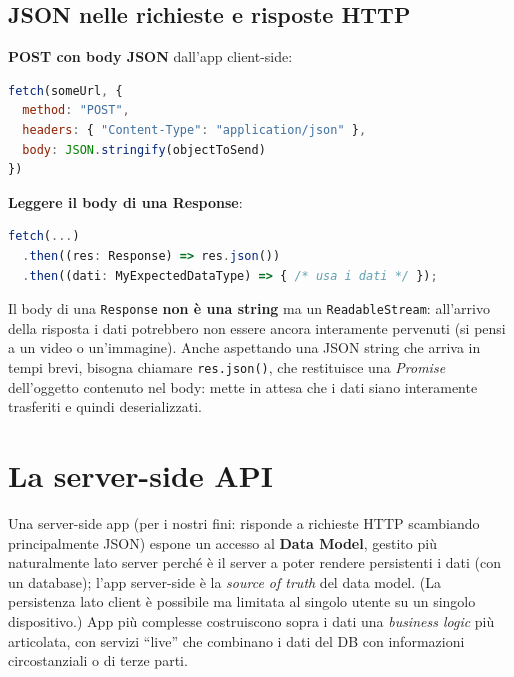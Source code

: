 \subsection{JSON nelle richieste e risposte HTTP}
\textbf{POST con body JSON} dall'app client-side:
\begin{lstlisting}[language=JavaScript]
fetch(someUrl, {
  method: "POST",
  headers: { "Content-Type": "application/json" },
  body: JSON.stringify(objectToSend)
})
\end{lstlisting}
\textbf{Leggere il body di una Response}:
\begin{lstlisting}[language=JavaScript]
fetch(...)
  .then((res: Response) => res.json())
  .then((dati: MyExpectedDataType) => { /* usa i dati */ });
\end{lstlisting}
\begin{attenzione}
Il body di una \texttt{Response} \textbf{non \`e una string} ma un
\texttt{ReadableStream}: all'arrivo della risposta i dati potrebbero non essere ancora
interamente pervenuti (si pensi a un video o un'immagine). Anche aspettando una JSON string
che arriva in tempi brevi, bisogna chiamare \texttt{res.json()}, che restituisce una
\emph{Promise} dell'oggetto contenuto nel body: mette in attesa che i dati siano interamente
trasferiti e quindi deserializzati.
\end{attenzione}

\section{La server-side API}

Una server-side app (per i nostri fini: risponde a richieste HTTP scambiando principalmente
JSON) espone un accesso al \textbf{Data Model}, gestito pi\`u naturalmente lato server
perch\'e \`e il server a poter rendere persistenti i dati (con un database); l'app
server-side \`e la \emph{source of truth} del data model. (La persistenza lato client \`e
possibile ma limitata al singolo utente su un singolo dispositivo.) App pi\`u complesse
costruiscono sopra i dati una \emph{business logic} pi\`u articolata, con servizi ``live''
che combinano i dati del DB con informazioni circostanziali o di terze parti.

